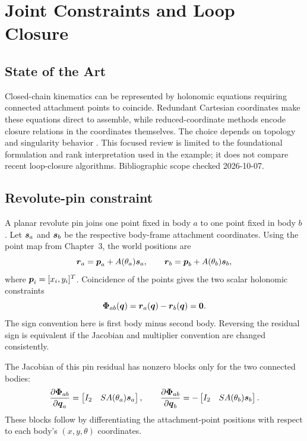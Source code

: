 \documentclass[../main.tex]{subfiles}
\begin{document}
\chapter{Joint Constraints and Loop Closure}
\label{chap:loop-constraints}

\section{State of the Art}
Closed-chain kinematics can be represented by holonomic equations requiring connected attachment points to coincide. Redundant Cartesian coordinates make these equations direct to assemble, while reduced-coordinate methods encode closure relations in the coordinates themselves. The choice depends on topology and singularity behavior \cite{shabana2013dynamics}. This focused review is limited to the foundational formulation and rank interpretation used in the example; it does not compare recent loop-closure algorithms. Bibliographic scope checked 2026-10-07.

\section{Revolute-pin constraint}

A planar revolute pin joins one point fixed in body $a$ to one point fixed in body $b$. Let $\boldsymbol{s}_a$ and $\boldsymbol{s}_b$ be the respective body-frame attachment coordinates. Using the point map from Chapter~3, the world positions are
\begin{equation}
	\boldsymbol{r}_a=\boldsymbol{p}_a+A(\theta_a)\boldsymbol{s}_a,
	\qquad
	\boldsymbol{r}_b=\boldsymbol{p}_b+A(\theta_b)\boldsymbol{s}_b,
	\label{eq:pin-world-points}
\end{equation}
where $\boldsymbol{p}_i=[x_i,y_i]^T$. Coincidence of the points gives the two scalar holonomic constraints
\begin{equation}
	\boldsymbol{\Phi}_{ab}(\boldsymbol{q})
	=\boldsymbol{r}_a(\boldsymbol{q})-\boldsymbol{r}_b(\boldsymbol{q})=\boldsymbol{0}.
	\label{eq:pin-constraint}
\end{equation}
The sign convention here is first body minus second body. Reversing the residual sign is equivalent if the Jacobian and multiplier convention are changed consistently.

The Jacobian of this pin residual has nonzero blocks only for the two connected bodies:
\begin{equation}
	\frac{\partial\boldsymbol{\Phi}_{ab}}{\partial\boldsymbol{q}_a}
	=\begin{bmatrix}I_2&SA(\theta_a)\boldsymbol{s}_a\end{bmatrix},
	\qquad
	\frac{\partial\boldsymbol{\Phi}_{ab}}{\partial\boldsymbol{q}_b}
	=-\begin{bmatrix}I_2&SA(\theta_b)\boldsymbol{s}_b\end{bmatrix}.
	\label{eq:pin-jacobian-blocks}
\end{equation}
These blocks follow by differentiating the attachment-point positions with respect to each body's $(x,y,\theta)$ coordinates.
\end{document}
